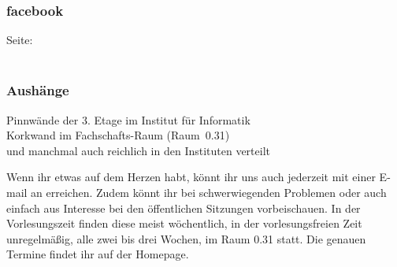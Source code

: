\subsubsection{facebook}
%	
    Seite:  \\
     \\
\subsubsection{Aushänge}
    Pinnwände der 3. Etage im Institut für Informatik \\
    Korkwand im Fachschafts-Raum (Raum~0.31) \\
    und manchmal auch reichlich in den Instituten verteilt

Wenn ihr etwas auf dem Herzen habt, könnt ihr uns auch jederzeit mit einer E-mail an  erreichen.
Zudem könnt ihr bei schwerwiegenden Problemen oder auch einfach aus Interesse bei den öffentlichen Sitzungen vorbeischauen.
In der Vorlesungszeit finden diese meist wöchentlich, in der vorlesungsfreien Zeit unregelmäßig, alle zwei bis drei Wochen, im Raum 0.31 statt.
Die genauen Termine findet ihr auf der Homepage.


